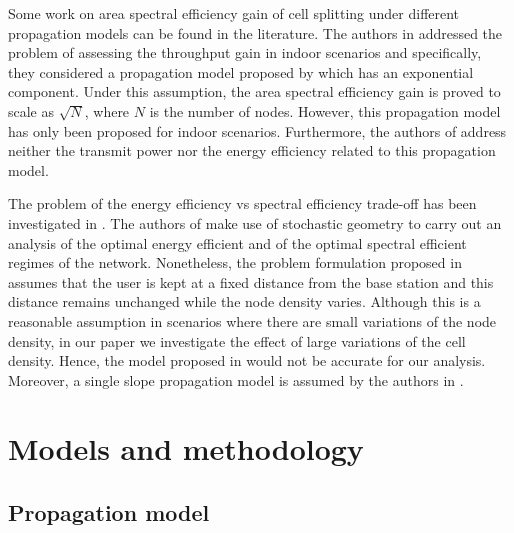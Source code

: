\documentclass[twocoumn]{IEEEtran}
\begin{document}
Some work on area spectral efficiency gain of cell splitting under
different propagation models can be found in the literature. The authors
in \cite{Ling2012} addressed the problem of assessing the throughput
gain in indoor scenarios and specifically, they considered a propagation model proposed by \cite{Medbo2000}
which has an exponential component. Under this assumption, the area spectral efficiency gain is proved to scale as $\sqrt{N}$, where $N$ is the number of nodes. However, this propagation model has only been proposed for indoor scenarios. Furthermore, the authors of \cite{Ling2012} address neither the transmit power nor the energy efficiency related to this propagation model.

The problem of the energy efficiency vs spectral efficiency trade-off
has been investigated in \cite{Rao2013}. The authors of \cite{Rao2013}
make use of stochastic geometry to carry out an analysis of the optimal
energy efficient and of the optimal spectral efficient regimes of the network.
Nonetheless, the problem formulation proposed in \cite{Rao2013}
assumes that the user is kept at a fixed distance from the base station
and this distance remains unchanged while the node density varies. Although this 
is a reasonable assumption in scenarios where there are small variations
of the node density, in our paper we investigate the effect of large
variations of the cell density. Hence, the model proposed in \cite{Rao2013}
would not be accurate for our analysis. Moreover, a single slope propagation model is assumed by the authors in \cite{Rao2013}.


\section{Models and methodology} \label{sec:systemModel}

\subsection{Propagation model}\label{subsec:propagationModel}
\end{document}
